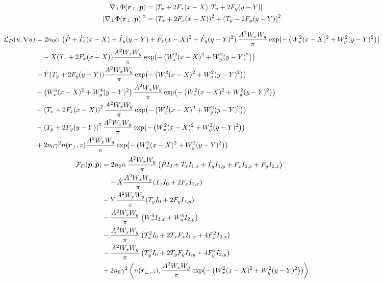 \begin{equation}
    \begin{split}
        \nabla_{\perp}\Phi(\mbox{\boldmath{$r$}}_{\perp},\mbox{\boldmath{$p$}}) &= \left[T_x + 2 F_x (x-X), T_y + 2 F_{y} (y-Y)\right] \\
        |\nabla_{\perp}\Phi(\mbox{\boldmath{$r$}}_{\perp},\mbox{\boldmath{$p$}})|^2 &= \left(T_x + 2 F_x (x-X)\right)^2 +  \left(T_y + 2 F_{y} (y-Y)\right)^2
    \end{split}
\end{equation}

\begin{equation}
    \begin{split}
    \mathcal{L}_{D}(u,\nabla u) & = 2 n_0 \alpha\, \left(\dot{P} + \dot{T}_x (x-X) + \dot{T}_y (y-Y) + \dot{F}_{x} (x-X)^2 + \dot{F}_{y} (y-Y)^2\right)\frac{A^2W_x W_y}{\pi} \exp{-\left( W_x^2(x-X)^2 + W_y^2(y-Y)^2 \right)} \\
        &\quad - \dot{X} (T_x + 2F_x(x-X)) \frac{A^2W_x W_y}{\pi} \exp{-\left( W_x^2(x-X)^2 + W_y^2(y-Y)^2 \right)}
\\
&- \dot{Y} (T_y + 2F_y(y-Y)) \frac{A^2W_x W_y}{\pi} \exp{-\left( W_x^2(x-X)^2 + W_y^2(y-Y)^2 \right)}
\\ 
        &- \left(W_x^4 (x-X)^2 +  W_y^4 (y-Y)^2\right) \frac{A^2W_x W_y}{\pi} \exp{-\left( W_x^2(x-X)^2 + W_y^2(y-Y)^2 \right)}
\\
        &- \left(T_x + 2 F_x (x-X)\right)^2 \frac{A^2W_x W_y}{\pi} \exp{-\left( W_x^2(x-X)^2 + W_y^2(y-Y)^2 \right)}
\\
        &-  \left(T_y + 2 F_{y} (y-Y)\right)^2 \frac{A^2W_x W_y}{\pi} \exp{-\left( W_x^2(x-X)^2 + W_y^2(y-Y)^2 \right)}
\\
        &+ 2n_0 \gamma^2 n(\vect{r}_{\perp},z) \frac{A^2W_x W_y}{\pi} \exp{-\left( W_x^2(x-X)^2 + W_y^2(y-Y)^2 \right)} \\
    \end{split}
\end{equation}
\begin{equation}
    \begin{split}
 \mathcal{F}_{D}(\vect{p},\dot{\vect{p}}) &= 2 n_0 \alpha\, \frac{A^2W_x W_y}{\pi} \left(\dot{P} I_0 + \dot{T}_x I_{1,x}  + \dot{T}_y I_{1,y} + \dot{F}_{x} I_{2,x} + \dot{F}_{y} I_{2,x}\right) \\
        &\quad - \dot{X} \frac{A^2W_x W_y}{\pi} (T_x I_0 + 2 F_x I_{1,x}) \\
&- \dot{Y}\frac{A^2W_x W_y}{\pi} (T_y I_0 + 2 F_y I_{1,y}) \\ 
        &- \frac{A^2W_x W_y}{\pi}\left(W_x^4 I_{2,x} +  W_y^4 I_{2,y}\right) \\
        &- \frac{A^2W_x W_y}{\pi}\left(T_x^2 I_0 + 2 T_{x} F_{x} I_{1,x} + 4 F_{x}^2 I_{2,x}\right) \\
        &- \frac{A^2W_x W_y}{\pi}\left(T_y^2 I_0 + 2 T_{y} F_{y} I_{1,y} + 4 F_{y}^2 I_{2,y}\right) \\
        &+ 2n_0 \gamma^2 \left<n(\vect{r}_{\perp},z), \frac{A^2W_x W_y}{\pi} \exp{-\left( W_x^2(x-X)^2 + W_y^2(y-Y)^2 \right)}\right>
    \end{split}
\end{equation}


